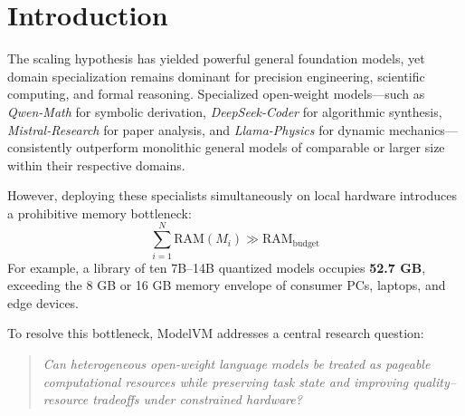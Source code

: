 \documentclass[10pt,twocolumn]{article}
\begin{document}
\section{Introduction}

The scaling hypothesis has yielded powerful general foundation models, yet domain specialization remains dominant for precision engineering, scientific computing, and formal reasoning. Specialized open-weight models---such as \textit{Qwen-Math} for symbolic derivation, \textit{DeepSeek-Coder} for algorithmic synthesis, \textit{Mistral-Research} for paper analysis, and \textit{Llama-Physics} for dynamic mechanics---consistently outperform monolithic general models of comparable or larger size within their respective domains.

However, deploying these specialists simultaneously on local hardware introduces a prohibitive memory bottleneck:
\begin{equation}
\sum_{i=1}^{N} \text{RAM}(M_i) \gg \text{RAM}_{\text{budget}}
\end{equation}
For example, a library of ten 7B--14B quantized models occupies \textbf{52.7 GB}, exceeding the 8 GB or 16 GB memory envelope of consumer PCs, laptops, and edge devices.

To resolve this bottleneck, ModelVM addresses a central research question:
\begin{quote}
\textit{Can heterogeneous open-weight language models be treated as pageable computational resources while preserving task state and improving quality--resource tradeoffs under constrained hardware?}
\end{quote}
\end{document}
